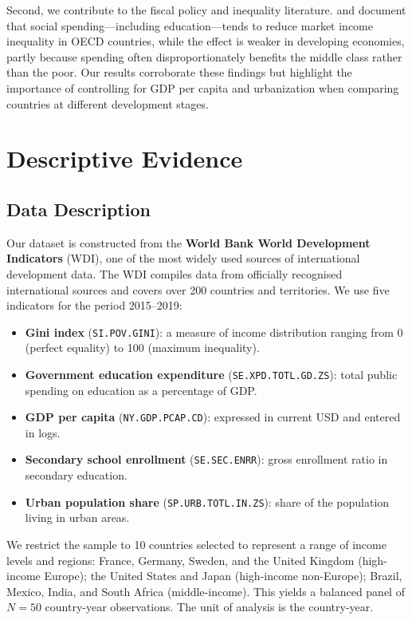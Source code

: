\documentclass[12pt,a4paper]{article}
\begin{document}
Second, we contribute to the fiscal policy and inequality literature. \citet{clements2012}
and \citet{imf2014fiscal} document that social spending---including education---tends to
reduce market income inequality in OECD countries, while the effect is weaker in
developing economies, partly because spending often disproportionately benefits the
middle class rather than the poor. Our results corroborate these findings but highlight
the importance of controlling for GDP per capita and urbanization when comparing
countries at different development stages.

\section{Descriptive Evidence}
\label{sec:data}

\subsection{Data Description}

Our dataset is constructed from the \textbf{World Bank World Development Indicators}
(WDI), one of the most widely used sources of international development data. The WDI
compiles data from officially recognised international sources and covers over 200
countries and territories. We use five indicators for the period 2015--2019:
\begin{itemize}
  \item \textbf{Gini index} (\texttt{SI.POV.GINI}): a measure of income distribution
        ranging from 0 (perfect equality) to 100 (maximum inequality).
  \item \textbf{Government education expenditure} (\texttt{SE.XPD.TOTL.GD.ZS}):
        total public spending on education as a percentage of GDP.
  \item \textbf{GDP per capita} (\texttt{NY.GDP.PCAP.CD}): expressed in current USD
        and entered in logs.
  \item \textbf{Secondary school enrollment} (\texttt{SE.SEC.ENRR}): gross enrollment
        ratio in secondary education.
  \item \textbf{Urban population share} (\texttt{SP.URB.TOTL.IN.ZS}): share of the
        population living in urban areas.
\end{itemize}

We restrict the sample to 10 countries selected to represent a range of income levels and
regions: France, Germany, Sweden, and the United Kingdom (high-income Europe); the
United States and Japan (high-income non-Europe); Brazil, Mexico, India, and South Africa
(middle-income). This yields a balanced panel of $N = 50$ country-year observations.
The unit of analysis is the country-year.
\end{document}
